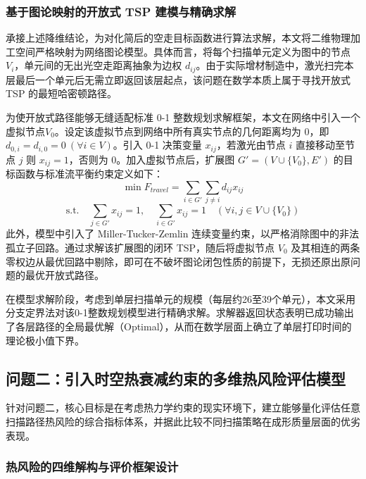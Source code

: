 \documentclass[a4paper, 12pt]{ctexart}
\begin{document}
\subsubsection{基于图论映射的开放式 TSP 建模与精确求解}

承接上述降维结论，为对化简后的空走目标函数进行算法求解，本文将二维物理加工空间严格映射为网络图论模型。具体而言，将每个扫描单元定义为图中的节点 $V_i$，单元间的无出光空走距离抽象为边权 $d_{ij}$。由于实际增材制造中，激光扫完本层最后一个单元后无需立即返回该层起点，该问题在数学本质上属于寻找开放式 TSP 的最短哈密顿路径。

为使开放式路径能够无缝适配标准 0-1 整数规划求解框架，本文在网络中引入一个虚拟节点$V_0$。设定该虚拟节点到网络中所有真实节点的几何距离均为 0，即 $d_{0,i} = d_{i,0} = 0 \ (\forall i \in V)$。引入 0-1 决策变量 $x_{ij}$，若激光由节点 $i$ 直接移动至节点 $j$ 则 $x_{ij}=1$，否则为 0。加入虚拟节点后，扩展图 $G' = (V \cup \{V_0\}, E')$ 的目标函数与标准流平衡约束定义如下：
\begin{equation}
    \min F_{travel} = \sum_{i \in G'} \sum_{j \neq i} d_{ij} x_{ij}
\end{equation}
\begin{equation}
    \text{s.t.} \quad \sum_{j \in G'} x_{ij} = 1, \quad \sum_{i \in G'} x_{ij} = 1 \quad (\forall i, j \in V \cup \{V_0\})
\end{equation}
此外，模型中引入了 Miller-Tucker-Zemlin 连续变量约束，以严格消除图中的非法孤立子回路。通过求解该扩展图的闭环 TSP，随后将虚拟节点 $V_0$ 及其相连的两条零权边从最优回路中剔除，即可在不破坏图论闭包性质的前提下，无损还原出原问题的最优开放式路径。

在模型求解阶段，考虑到单层扫描单元的规模（每层约26至39个单元），本文采用分支定界法对该0-1整数规划模型进行精确求解。求解器返回状态表明已成功输出了各层路径的全局最优解（Optimal），从而在数学层面上确立了单层打印时间的理论极小值下界。

\subsection{问题二：引入时空热衰减约束的多维热风险评估模型}

针对问题二，核心目标是在考虑热力学约束的现实环境下，建立能够量化评估任意扫描路径热风险的综合指标体系，并据此比较不同扫描策略在成形质量层面的优劣表现。

\subsubsection{热风险的四维解构与评价框架设计}
\end{document}
